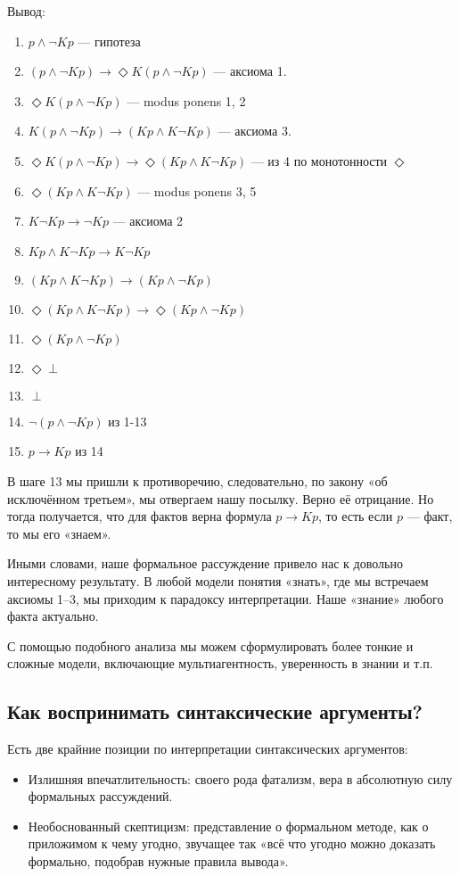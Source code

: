 \documentclass[openany]{book}
\theoremstyle{plain}
\theoremstyle{definition}
\begin{document}
Вывод:
\begin{enumerate}
\item \(p \land \neg Kp\) — гипотеза
\item \((p \land \neg Kp) \to \Diamond K (p \land \neg K p)\) — аксиома 1.
\item \(\Diamond K(p \land \neg K p)\) — modus ponens 1, 2
\item \(K(p \land \neg Kp) \to (Kp \land K \neg Kp)\) — аксиома 3.
\item \(\Diamond K(p \land \neg K p) \to \Diamond (Kp \land K\neg Kp)\) — из 4 по монотонности \(\Diamond\)
\item \(\Diamond(K p \land K \neg Kp)\) — modus ponens 3, 5
\item \(K \neg Kp \to \neg Kp\) — аксиома 2
\item \(Kp \land K \neg Kp \to K \neg Kp\)
\item \((Kp \land K \neg Kp) \to (Kp \land \neg Kp)\)
\item \(\Diamond (Kp \land K\neg Kp) \to \Diamond(Kp \land \neg Kp)\)
\item \(\Diamond (Kp \land \neg Kp)\)
\item \(\Diamond \perp\)
\item \(\perp\)
\item \(\neg (p \land \neg Kp)\) из 1-13
\item \(p \to Kp\) из 14
\end{enumerate}

В шаге 13 мы пришли к противоречию, следовательно, по закону «об исключённом третьем», мы отвергаем нашу посылку. Верно её отрицание. Но тогда получается, что для фактов верна формула \(p \to Kp\), то есть если \(p\) --- факт, то мы его «знаем».

Иными словами, наше формальное рассуждение привело нас к довольно интересному результату. В любой модели понятия «знать», где мы встречаем аксиомы 1–3, мы приходим к парадоксу интерпретации. Наше «знание» любого факта актуально.

С помощью подобного анализа мы можем сформулировать более тонкие и сложные модели, включающие мультиагентность, уверенность в знании и т.п.

\subsection{ Как воспринимать синтаксические аргументы? }

Есть две крайние позиции по интерпретации синтаксических аргументов:\
\begin{itemize}
\item Излишняя впечатлительность:
своего рода фатализм, вера в абсолютную силу формальных рассуждений.
\item Необоснованный скептицизм:
представление о формальном методе, как о приложимом к чему угодно, звучащее так «всё что угодно можно доказать формально, подобрав нужные правила вывода».
\end{itemize}
\end{document}
